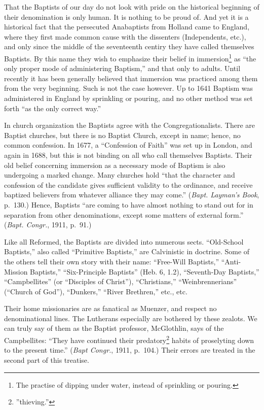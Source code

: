 \documentclass[
]{book}
\begin{document}
That the Baptists of our day do not look with pride on the historical beginning of their denomination is only human. It is nothing to be proud of. And yet it is a historical fact that the persecuted Anabaptists from Holland came to England, where they first made common cause with the dissenters (Independents, etc.), and only since the middle of the seventeenth centiry they have called themselves Baptists. By this name they wish to emphasize their belief in immersion\footnote{The practise of dipping under water, instead of sprinkling or pouring.} as ``the only proper mode of administering Baptism,'' and that only to adults. Until recently it has been generally believed that immersion was practiced among them from the very beginning. Such is not the case however. Up to 1641 Baptism was administered in England by sprinkling or pouring, and no other method was set forth ``as the only correct way.''

In church organization the Baptists agree with the Congregationalists. There are Baptist churches, but there is no Baptist Church, except in name; hence, no common confession. In 1677, a ``Confession of Faith'' was set up in London, and again in 1688, but this is not binding on all who call themselves Baptists. Their old belief concerning immersion as a necessary mode of Baptism is also undergoing a marked change. Many churches hold ``that the character and confession of the candidate gives sufficient validity to the ordinance, and receive baptized believers from whatever alliance they may come.'' (\emph{Bapt. Layman's Book}, p.~130.) Hence, Baptists ``are coming to have almost nothing to stand out for in separation from other denominations, except some matters of external form.'' (\emph{Bapt. Congr.}, 1911, p.~91.)

Like all Reformed, the Baptists are divided into numerous sects. ``Old-School Baptists,'' also called ``Primitive Baptists,'' are Calvinistic in doctrine. Some of the others tell their own story with their name: ``Free-Will Baptists,'' ``Anti-Mission Baptists,'' ``Six-Principle Baptists'' (Heb. 6, 1.2), ``Seventh-Day Baptists,'' ``Campbellites'' (or ``Disciples of Christ''), ``Christians,'' ``Weinbrennerians'' (``Church of God''), ``Dunkers,'' ``River Brethren,'' etc., etc.

Their home missionaries are as fanatical as Muenzer, and respect no denominational lines. The Lutherans especially are bothered by these zealots. We can truly say of them as the Baptist professor, McGlothlin, says of the Campbellites: ``They have continued their predatory\footnote{''thieving.''} habits of proselyting down to the present time.'' (\emph{Bapt Congr.}, 1911, p.~104.) Their errors are treated in the second part of this treatise.
\end{document}
